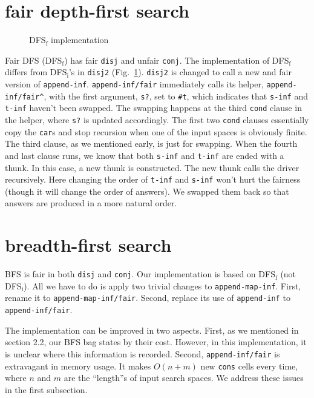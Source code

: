 \documentclass[format=acmlarge, review=true, authordraft=true]{acmart}
\newcommand{\conj}{\texttt{conj}}
\newcommand{\disj}{\texttt{disj}}
\begin{document}
\section{fair depth-first search}

\begin{figure}
	
	\caption{DFS$_\textrm{f}$ implementation}
	\label{fDFS}
\end{figure}

Fair DFS (DFS$_\textrm{f}$) has fair \disj{} and unfair \conj{}. The implementation of DFS$_\textrm{f}$ 
differs from DFS$_\textrm{i}$'s in \texttt{disj2} (Fig.~\ref{fDFS}). \texttt{disj2} is 
changed to call a new and fair version of \texttt{append-inf}. 
\texttt{append-inf/fair} immediately calls its helper, 
\texttt{append-inf/fair\^{}}, with the first argument, \texttt{s?}, set to 
\texttt{\#{}t}, which indicates that \texttt{s-inf} and \texttt{t-inf} haven't 
been swapped. The swapping happens at the third \texttt{cond} clause in the 
helper, where \texttt{s?} is updated accordingly. The first two \texttt{cond} 
clauses essentially copy the \texttt{car}s and stop recursion when one of the 
input spaces is obviously finite. The third clause, as we mentioned early, is 
just for swapping. When the fourth and last clause runs, we know that both 
\texttt{s-inf} and \texttt{t-inf} are ended with a thunk. In this case, a new 
thunk is constructed. The new thunk calls the driver recursively. Here changing 
the order of \texttt{t-inf} and \texttt{s-inf} won't hurt the fairness (though 
it will change the order of answers). We swapped them back so that answers are 
produced in a more natural order.


\section{breadth-first search}

BFS is fair in both \disj{} and \conj{}. Our implementation is based on 
DFS$_\textrm{f}$ (not DFS$_\textrm{i}$). All we have to do is apply two trivial changes to 
\texttt{append-map-inf}. First, rename it to \texttt{append-map-inf/fair}. 
Second, replace its use of \texttt{append-inf} to \texttt{append-inf/fair}. 

The implementation can be improved in two aspects. First, as we mentioned in 
section 2.2, our BFS bag states by their cost. However, in this implementation, 
it is unclear where this information is recorded. Second, 
\texttt{append-inf/fair} is extravagant in memory usage. It makes 
$O(n+m)$ new \texttt{cons} cells every time, where $n$ and $m$ are the 
``length''s of input search spaces. We address these issues in the first 
subsection.
\end{document}
